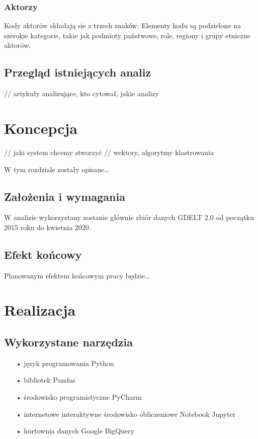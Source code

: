 \documentclass[11pt]{report}
\begin{document}
    \subsection{Aktorzy}
    Kody aktorów składają sie z trzech znaków.
    Elementy kodu są podzielone na szerokie kategorie, takie jak podmioty państwowe, role, regiony i grupy etniczne aktorów.


    \section{Przegląd istniejących analiz} \label{ch:przeglad}
    // artykuły analizujące, kto cytował, jakie analizy


    \chapter{Koncepcja}
    // jaki system chcemy stworzyć
    // wektory, algorytmy klastrowania

    W tym rozdziale zostały opisane\ldots


    \section{Założenia i wymagania}
    W analizie wykorzystany zostanie głównie zbiór danych GDELT 2.0 od początku 2015 roku do kwietnia 2020.


    \section{Efekt końcowy}
    Planowanym efektem końcowym pracy będzie\ldots


    \chapter{Realizacja}


    \section{Wykorzystane narzędzia}

    \begin{enumerate}
        \item[•] język programowania Python~\cite{python}
        \item[•] bibliotek Pandas~\cite{pandas}
        \item[•] środowisko programistyczne PyCharm~\cite{pycharm}
        \item[•] internetowe interaktywne środowisko obliczeniowe Notebook Jupyter~\cite{jupyter}
        \item[•] hurtownia danych Google BigQuery~\cite{bigquery}
    \end{enumerate}
\end{document}
